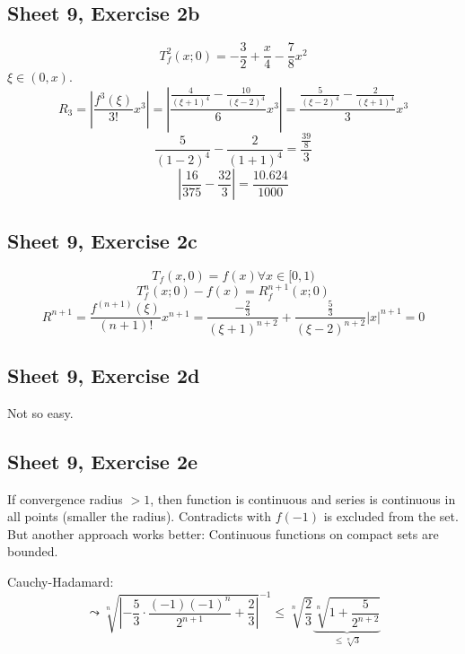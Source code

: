 \documentclass{article}
\newcommand{\card}[1]{\left|#1\right|}
\begin{document}
\subsection{Sheet 9, Exercise 2b}
\[ T_f^2(x; 0) = -\frac32 + \frac x4 - \frac78 x^2 \]
$\xi \in (0, x)$.
\[ R_3 = \card{\frac{f^3(\xi)}{3!} x^3} = \card{\frac{\frac{4}{(\xi + 1)^4} - \frac{10}{(\xi - 2)^4}}{6} x^3} = \frac{\frac{5}{(\xi - 2)^4} - \frac{2}{(\xi + 1)^4}}{3} x^3 \]
\[ \frac{5}{(1 - 2)^4} - \frac{2}{(1 + 1)^4} = \frac{\frac{39}8}{3} \]
\[ \card{\frac{16}{375} - \frac{32}{3}} = \frac{10.624}{1000} \]

\subsection{Sheet 9, Exercise 2c}
\[ T_f(x, 0) = f(x) \forall x \in [0, 1) \]
\[ T_f^n(x; 0) - f(x) = R^{n+1}_f(x; 0) \]
\[ R^{n+1} = \frac{f^{(n+1)}(\xi)}{(n+1)!} x^{n+1} = \frac{-\frac23}{(\xi + 1)^{n+2}} + \frac{\frac53}{(\xi - 2)^{n+2}} \card{x}^{n+1} = 0 \]

\subsection{Sheet 9, Exercise 2d}
Not so easy.

\subsection{Sheet 9, Exercise 2e}
If convergence radius $>1$, then function is continuous and series is continuous in all points (smaller the radius). Contradicts with $f(-1)$ is excluded from the set. But another approach works better: Continuous functions on compact sets are bounded.

Cauchy-Hadamard:
\[ \leadsto \sqrt[n]{\card{-\frac53 \cdot \frac{(-1)(-1)^n}{2^{n+1}} + \frac23}}^{-1} \leq \sqrt[n]{\frac23} \underbrace{\sqrt[n]{1 + \frac{5}{2^{n+2}}}}_{\leq \sqrt[n]{3}} \]
\end{document}
